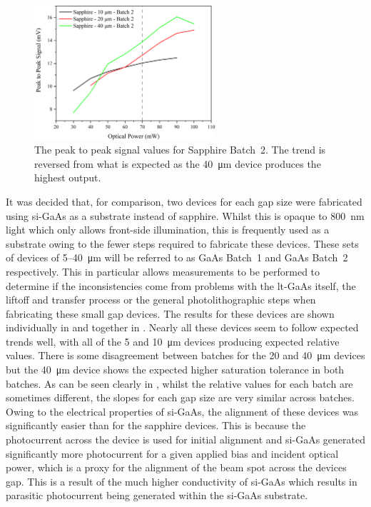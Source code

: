 \begin{figure}[h!b]
    \centering
    \includegraphics[width=0.6\textwidth]{Figures/Misc/SysDev/OptBatch2Sapph.png}
    \captionsetup{font = footnotesize, justification = centering}
    \caption[The Peak to Peak Signal Values for Sapphire Batch~2]{The peak to peak signal values for Sapphire Batch~2. The trend is reversed from what is expected as the \SI{40}{\micro\metre} device produces the highest output.}
    \label{fig:sapphbatch2}
\end{figure}

It was decided that, for comparison, two devices for each gap size were fabricated using \acrshort{si}\nobreakdash-GaAs as a substrate instead of sapphire. Whilst this is opaque to \SI{800}{\nano\metre} light which only allows front\nobreakdash-side illumination, this is frequently used as a substrate owing to the fewer steps required to fabricate these devices. These sets of devices of 5\nobreakdash--\SI{40}{\micro\metre} will be referred to as GaAs Batch~1 and GaAs Batch~2 respectively. This in particular allows measurements to be performed to determine if the inconsistencies come from problems with the \acrshort{lt}\nobreakdash-GaAs itself, the liftoff and transfer process or the general photolithographic steps when fabricating these small gap devices. The results for these devices are shown individually in  and together in . Nearly all these devices seem to follow expected trends well, with all of the 5 and \SI{10}{\micro\metre} devices producing expected relative values. There is some disagreement between batches for the 20 and \SI{40}{\micro\metre} devices but the \SI{40}{\micro\metre} device shows the expected higher saturation tolerance in both batches. As can be seen clearly in , whilst the relative values for each batch are sometimes different, the slopes for each gap size are very similar across batches. 
Owing to the electrical properties of \acrshort{si}\nobreakdash-GaAs, the alignment of these devices was significantly easier than for the sapphire devices. This is because the photocurrent across the device is used for initial alignment and \acrshort{si}\nobreakdash-GaAs generated significantly more photocurrent for a given applied bias and incident optical power, which is a proxy for the alignment of the beam spot across the devices gap. This is a result of the much higher conductivity of \acrshort{si}\nobreakdash-GaAs which results in parasitic photocurrent being generated within the \acrshort{si}\nobreakdash-GaAs substrate.

